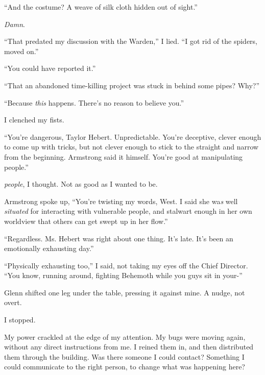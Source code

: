 ``And the costume?  A weave of silk cloth hidden out of sight.''



\emph{Damn}.



``That predated my discussion with the Warden,'' I lied.  ``I got rid of the spiders, moved on.''



``You could have reported it.''



``That an abandoned time-killing project was stuck in behind some pipes?  Why?''



``Because \emph{this} happens.  There's no reason to believe you.''



I clenched my fists.



``You're dangerous, Taylor Hebert.  Unpredictable.  You're deceptive, clever enough to come up with tricks, but not clever enough to stick to the straight and narrow from the beginning.  Armstrong said it himself.  You're good at manipulating people.''



\emph{\ldotsManipulating people}, I thought.  Not as good as I wanted to be.



Armstrong spoke up, ``You're twisting my words, West.  I said she wa\emph{s }well\emph{ situated }for interacting with vulnerable people, and stalwart enough in her own worldview that others can get swept up in her flow.''



``Regardless.  Ms. Hebert was right about one thing.  It's late.  It's been an emotionally exhausting day.''



``Physically exhausting too,'' I said, not taking my eyes off the Chief Director.  ``You know, running around, fighting Behemoth while you guys sit in your-''



Glenn shifted one leg under the table, pressing it against mine.  A nudge, not overt.



I stopped.



My power crackled at the edge of my attention.  My bugs were moving again, without any direct instructions from me.  I reined them in, and then distributed them through the building.  Was there someone I could contact?  Something I could communicate to the right person, to change what was happening here?



